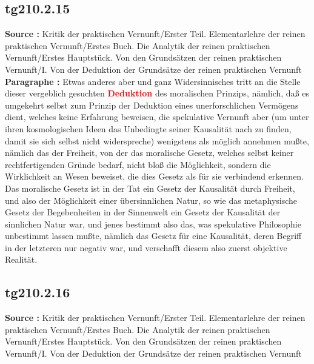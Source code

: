 \documentclass[a4paper,12pt,twoside]{book}
\newcommand{\match}[1]{\textcolor{red}{\textbf{#1}}}
\begin{document}
	\subsection*{tg210.2.15} 
	\textbf{Source : }Kritik der praktischen Vernunft/Erster Teil. Elementarlehre der reinen praktischen Vernunft/Erstes Buch. Die Analytik der reinen praktischen Vernunft/Erstes Hauptstück. Von den Grundsätzen der reinen praktischen Vernunft/I. Von der Deduktion der Grundsätze der reinen praktischen Vernunft\\  
	
	\noindent\textbf{Paragraphe : }Etwas anderes aber und ganz Widersinnisches tritt an die Stelle dieser vergeblich gesuchten \match{Deduktion} des moralischen  Prinzips, nämlich, daß es umgekehrt selbst zum Prinzip der Deduktion eines unerforschlichen Vermögens dient, welches keine Erfahrung beweisen, die spekulative Vernunft aber (um unter ihren kosmologischen Ideen das Unbedingte seiner Kausalität nach zu finden, damit sie sich selbst nicht widerspreche) wenigstens als möglich annehmen mußte, nämlich das der Freiheit, von der das moralische Gesetz, welches selbst keiner rechtfertigenden Gründe bedarf, nicht bloß die Möglichkeit, sondern die Wirklichkeit an Wesen beweiset, die dies Gesetz als für sie verbindend erkennen. Das moralische Gesetz ist in der Tat ein Gesetz der Kausalität durch Freiheit, und also der Möglichkeit einer übersinnlichen Natur, so wie das metaphysische Gesetz der Begebenheiten in der Sinnenwelt ein Gesetz der Kausalität der sinnlichen Natur war, und jenes bestimmt also das, was spekulative Philosophie unbestimmt lassen mußte, nämlich das Gesetz für eine Kausalität, deren Begriff in der letzteren nur negativ war, und verschafft diesem also zuerst objektive Realität. 
	
	\subsection*{tg210.2.16} 
	\textbf{Source : }Kritik der praktischen Vernunft/Erster Teil. Elementarlehre der reinen praktischen Vernunft/Erstes Buch. Die Analytik der reinen praktischen Vernunft/Erstes Hauptstück. Von den Grundsätzen der reinen praktischen Vernunft/I. Von der Deduktion der Grundsätze der reinen praktischen Vernunft\\  
	
\end{document}
